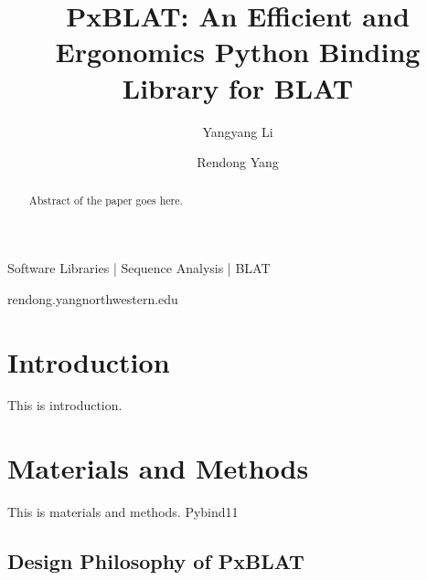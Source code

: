 
\title{PxBLAT: An Efficient and Ergonomics Python Binding Library for BLAT}

\author[1]{Yangyang Li}
\author[1,\Letter]{Rendong Yang }
\date{}

\maketitle

\begin{abstract}
	Abstract of the paper goes here.
\end{abstract}


\begin{keywords}
	Software Libraries |  Sequence Analysis | BLAT
\end{keywords}

\begin{corrauthor}
	rendong.yang\at northwestern.edu
\end{corrauthor}

\section*{Introduction}\label{sec:introduction}

This is introduction.

\section*{Materials and Methods}\label{sec:materials-and-methods}

This is materials and methods.
Pybind11 ~\citep{pybind11}

\subsection*{Design Philosophy of PxBLAT}\label{ssec:design-philosophy-of-pxblat}


